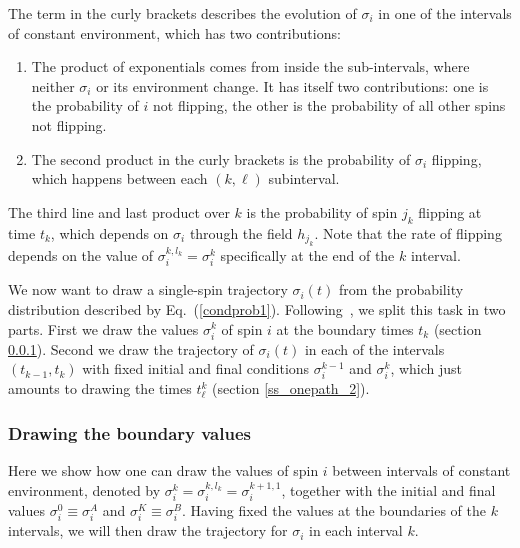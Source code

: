 \documentclass[aps,twocolumn,floats,pre,amsmath,superscriptaddress]{revtex4}
\let\s=\sigma \let\t=\tau \let\f=\varphi \let\ph=\varphi\let\c=\chi
\newcommand{\<}{\langle}
\renewcommand{\>}{\rangle}
\begin{document}
The term in the curly brackets describes the evolution of $\sigma_i$ in one of the intervals of constant environment,
which has two contributions:
\begin{enumerate}
\item
 The product of exponentials comes from inside the sub-intervals, where neither
 $\s_i$ or its environment change. It has itself two contributions: one is
  the probability of $i$ not flipping, the other is the probability of
  all other spins not flipping.
\item
 The second product in the curly brackets is the probability of
 $\sigma_i$ flipping, which happens between each $(k,\ell)$ subinterval.
\end{enumerate}
The third line and last product over $k$ is the probability of 
spin $j_k$ flipping at time $t_k$, which depends on $\sigma_i$ through
the field $h_{j_k}$. Note that the rate of flipping depends on the value of $\sigma_i^{k,l_k} = \sigma_i^k$ 
specifically at the end of the $k$ interval.

We now want to draw a single-spin trajectory $\sigma_i(t)$ from the
probability distribution described by Eq.~(\ref{condprob1}). 
Following~\cite{francescoprb}, we split
this task in two parts.
First we draw the values $\sigma_i^k$ of spin $i$ at the boundary times $t_k$
(section \ref{ss_onepath_1}). Second we draw the trajectory of $\sigma_i(t)$ in each of
the intervals $(t_{k-1},t_k)$ with fixed initial and final conditions
$\sigma_i^{k-1}$ and $\sigma_i^k$, which just amounts to drawing the
times $t^k_\ell$ (section \ref{ss_onepath_2}).

\subsubsection{Drawing the boundary values}\label{ss_onepath_1}

Here we show how one can draw the values of spin $i$ between intervals of constant environment, 
denoted by $\sigma_i^k = \sigma_i^{k,l_k}=\sigma_i^{k+1,1}$, 
together with the initial and final values $\sigma^0_i\equiv
\sigma^A_{i}$ and $\sigma^{K}_i\equiv \sigma^B_{i}$.
Having fixed the values at the boundaries of the $k$ intervals, 
we will then draw the trajectory for $\sigma_i$ in each interval $k$. 
\end{document}
